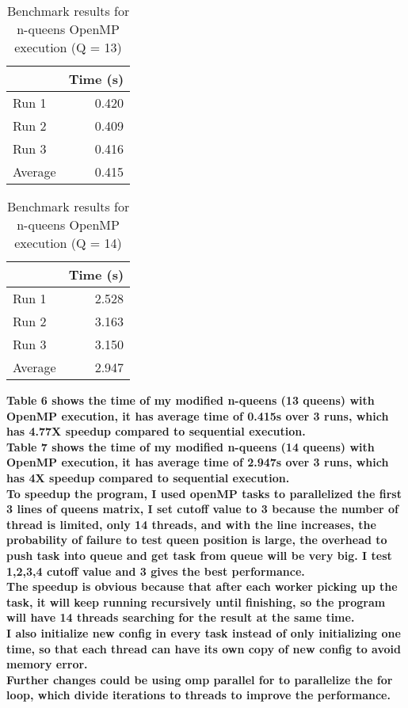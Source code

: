 \documentclass[12pt]{article}
\begin{document}
\begin{table}[H]
  \centering
  \begin{tabular}{lr}
    & {\bf Time (s)} \\
    \hline
    Run 1 & 0.420 \\
    Run 2 & 0.409 \\
    Run 3 & 0.416  \\
    \hline
    Average & 0.415 \\
  \end{tabular}
  \caption{Benchmark results for n-queens OpenMP execution  (Q = 13)}
  \label{tbl-fib-sequential}
\end{table}

\begin{table}[H]
  \centering
  \begin{tabular}{lr}
    & {\bf Time (s)} \\
    \hline
    Run 1 & 2.528 \\
    Run 2 & 3.163 \\
    Run 3 & 3.150  \\
    \hline
    Average & 2.947 \\
  \end{tabular}
  \caption{Benchmark results for n-queens OpenMP execution  (Q = 14)}
  \label{tbl-fib-sequential}
\end{table}


{\bf Table 6 shows the time of my modified n-queens (13 queens) with OpenMP execution, it has average time of 0.415s over 3 runs, which has 4.77X speedup compared to sequential execution.
}
\\
{\bf Table 7 shows the time of my modified n-queens (14 queens) with OpenMP execution, it has average time of 2.947s over 3 runs, which has 4X speedup compared to sequential execution.
}
\\
{\bf To speedup the program, I used openMP tasks to parallelized the first 3 lines of queens matrix, I set cutoff value to 3 because the number of thread is limited, only 14 threads, and with the line increases, the probability of failure to test queen position is large, the overhead to push task into queue and get task from queue will be very big. I test 1,2,3,4 cutoff value and 3 gives the best performance.}
\\
{\bf The speedup is obvious because that after each worker picking up the task, it will keep running recursively until finishing, so the program will have 14 threads searching for the result at the same time.}
\\
{\bf I also initialize new config in every task instead of only initializing one time, so that each thread can have its own copy of new config to avoid memory error.
}
\\
{\bf Further changes could be using omp parallel for to parallelize the for loop, which divide iterations to threads to improve the performance.
}
\end{document}
